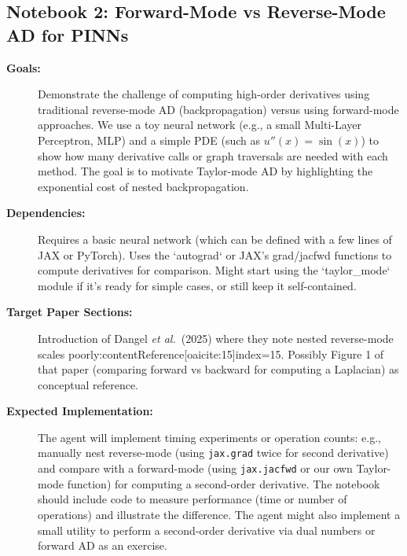 \documentclass[11pt]{article}
\begin{document}
\subsection{Notebook 2: Forward-Mode vs Reverse-Mode AD for PINNs}
\begin{description}
  \item[\textbf{Goals:}] Demonstrate the challenge of computing high-order derivatives using traditional reverse-mode AD (backpropagation) versus using forward-mode approaches. We use a toy neural network (e.g., a small Multi-Layer Perceptron, MLP) and a simple PDE (such as $u''(x) = \sin(x)$) to show how many derivative calls or graph traversals are needed with each method. The goal is to motivate Taylor-mode AD by highlighting the exponential cost of nested backpropagation.
  \item[\textbf{Dependencies:}] Requires a basic neural network (which can be defined with a few lines of JAX or PyTorch). Uses the `autograd` or JAX's grad/jacfwd functions to compute derivatives for comparison. Might start using the `taylor_mode` module if it's ready for simple cases, or still keep it self-contained.
  \item[\textbf{Target Paper Sections:}] Introduction of Dangel \textit{et al.}\ (2025) where they note nested reverse-mode scales poorly:contentReference[oaicite:15]{index=15}. Possibly Figure 1 of that paper (comparing forward vs backward for computing a Laplacian) as conceptual reference.
  \item[\textbf{Expected Implementation:}] The agent will implement timing experiments or operation counts: e.g., manually nest reverse-mode (using \texttt{jax.grad} twice for second derivative) and compare with a forward-mode (using \texttt{jax.jacfwd} or our own Taylor-mode function) for computing a second-order derivative. The notebook should include code to measure performance (time or number of operations) and illustrate the difference. The agent might also implement a small utility to perform a second-order derivative via dual numbers or forward AD as an exercise.
\end{description}
\end{document}
